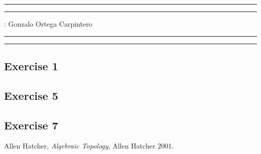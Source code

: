 \documentclass[11pt,a4paper]{article}
\begin{document}
\hrule\hrule
\vspace{1mm}


\vspace{1mm}

 : Gonzalo Ortega Carpintero
\vspace{2mm}

\hrule\hrule

\subsection*{Exercise 1}

\subsection*{Exercise 5}

\subsection*{Exercise 7}

\begin{thebibliography}{9}

  Allen Hatcher,
  \textit{Algebraic Topology},
  Allen Hatcher 2001.

\end{thebibliography}
\end{document}
